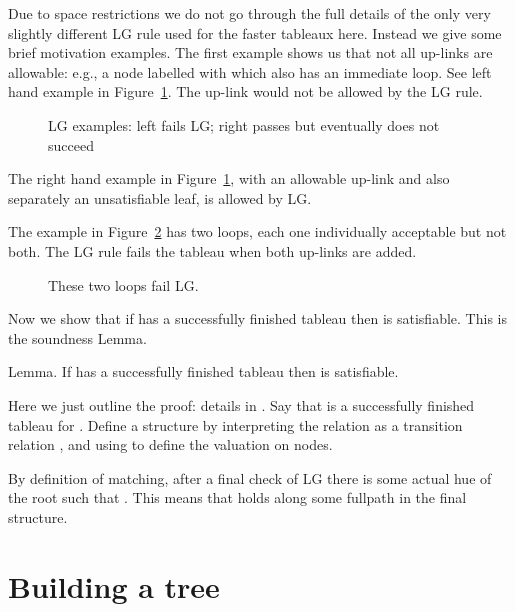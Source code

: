 \documentclass[submission,copyright,creativecommons]{eptcs}
\newenvironment{lemma}{Lemma. }{}
\begin{document}
Due to space restrictions we do not go through the full
details of the only very slightly 
different LG rule used for the
faster tableaux here.
Instead we give some brief motivation examples.
The first example shows us that not all up-links are allowable:
e.g., a node labelled with  
which also has an immediate loop.
See left hand example in Figure~\ref{fig:lgnaeg}.
The up-link would not be allowed by the LG rule.


\begin{figure}




\caption{LG examples: left fails LG; right
passes but eventually does not succeed}

\label{fig:lgnaeg}
\end{figure}

The right hand example in Figure~\ref{fig:lgnaeg},
with an allowable up-link and also separately
an unsatisfiable leaf,
is allowed by LG.

The example in Figure~\ref{fig:lgtwoeg} has two loops, each 
one individually acceptable but not both.
The LG rule fails the tableau when both up-links are added.


\begin{figure}




\caption{These two loops fail LG.}

\label{fig:lgtwoeg}
\end{figure}


Now we show that if  has a successfully finished tableau
then  is satisfiable.
This is the soundness Lemma.

\begin{lemma}
If  has a successfully finished tableau
then  is satisfiable.
\end{lemma}

Here we just outline the proof: details in \cite{Rey:fasttablong}.
Say that  is a successfully finished tableau for .
Define a structure  
by interpreting the  relation as a transition relation ,
and using  to define the valuation  on nodes.

 By definition of matching,
 after a final check of LG
 there is some actual hue  of the root 
 such that .
 This means that  holds
 along some fullpath in the 
 final structure.


\section{Building a tree}
\label{sec:build}
\end{document}
